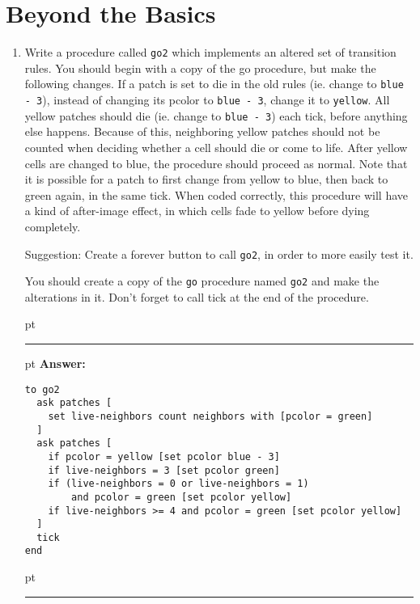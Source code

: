 \documentclass[11pt]{book}
\begin{document}
\section{Beyond the Basics}
\begin{enumerate}

\item Write a procedure called \texttt{go2} which implements an altered set of transition rules. You should begin with a copy of the go procedure, but make the following changes. If a patch is set to die in the old rules (ie. change to \texttt{blue - 3}), instead of changing its pcolor to \texttt{blue - 3}, change it to \texttt{yellow}. All yellow patches should die (ie. change to \texttt{blue - 3}) each tick, before anything else happens. Because of this, neighboring yellow patches should not be counted when deciding whether a cell should die or come to life. After yellow cells are changed to blue, the procedure should proceed as normal. Note that it is possible for a patch to first change from yellow to blue, then back to green again, in the same tick. When coded correctly, this procedure will have a kind of after-image effect, in which cells fade to yellow before dying completely.

Suggestion: Create a forever button to call \texttt{go2}, in order to more easily test it.

You should create a copy of the \texttt{go} procedure named \texttt{go2} and make the alterations in it. Don't forget to call tick at the end of the procedure.

\ifnum{}
 pt
\hrule
{} pt
{\bf Answer: }
\begin{verbatim}
to go2
  ask patches [
    set live-neighbors count neighbors with [pcolor = green]
  ]
  ask patches [
    if pcolor = yellow [set pcolor blue - 3]
    if live-neighbors = 3 [set pcolor green]
    if (live-neighbors = 0 or live-neighbors = 1) 
        and pcolor = green [set pcolor yellow]
    if live-neighbors >= 4 and pcolor = green [set pcolor yellow]
  ]
  tick
end
\end{verbatim}
 pt
\hrule
\fi


\end{enumerate}
\end{document}
